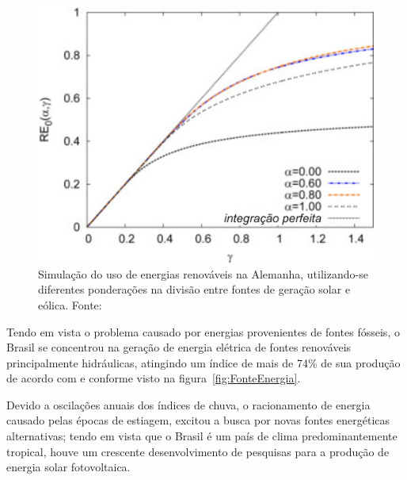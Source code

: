 \FloatBarrier
\begin{figure}[htbp]
	\centering
	\includegraphics[scale=1.5]{imagens/wind_solar}
	\caption{Simulação do uso de energias renováveis na Alemanha, utilizando-se diferentes ponderações na divisão entre fontes de geração solar e eólica. Fonte:   }
	
	\label{fig:Wind_sol}
\end{figure}
\FloatBarrier

Tendo em vista o problema causado por energias provenientes de fontes fósseis, o Brasil se concentrou na geração de energia elétrica de fontes renováveis principalmente hidráulicas, atingindo um índice de mais de 74\% de sua produção de acordo com  e conforme visto na figura~\ref{fig:FonteEnergia}.

Devido a oscilações anuais dos índices de chuva, o racionamento de energia causado pelas épocas de estiagem, excitou a busca por novas fontes energéticas alternativas; tendo em vista que o Brasil é um país de clima predominantemente tropical, houve um crescente  desenvolvimento de pesquisas para a produção de energia solar fotovoltaica. 

